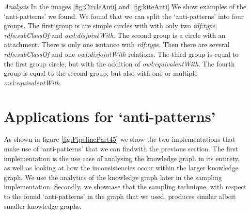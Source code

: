 \documentclass[11pt,letterpaper ,oneside ]{book}
\begin{document}
\begin{figure}[!t]
\end{figure}

\textit{Analysis} In the images \ref{fig:CircleAnti} and \ref{fig:kiteAnti} We show examples of the `anti-patterns' we found. We found that we can split the `anti-patterns' into four groups. The first group is are simple circles with with only two \textit{rdf:type}, \textit{rdfs:subClassOf} and \textit{owl:disjointWith}. The second group is a circle with an attachment. There is only one isntance with \textit{rdf:type}. Then there are several \textit{rdfs:subClassOf} and one \textit{owl:disjointWith} relations. The third group is equal to the first group circle, but with the addition of \textit{owl:equivalentWith}. The fourth group is equal to the second group, but also with one or multiple \textit{owl:equivalentWith}. \\

\newpage

\chapter{Applications for `anti-patterns'}\label{Implementation}
As shown in figure \ref{fig:PipelinePart45} we show the two implementations that make use of `anti-patterns' that we can findwith the previous section. The first implementation is the use case of analysing the knowledge graph in its entirety, as well as looking at how the inconsistencies occur within the larger knowledge graph. We use the analytics of the knowledge graph later in the sampling implementation. Secondly, we showcase that the sampling technique, with respect to the found `anti-patterns' in the graph that we used, produces similar albeit smaller knowledge graphs.
\end{document}
